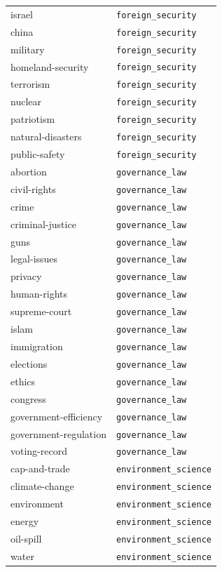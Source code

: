 \begin{longtable}{ll}
israel & \texttt{foreign\_security} \\
china & \texttt{foreign\_security} \\
military & \texttt{foreign\_security} \\
homeland-security & \texttt{foreign\_security} \\
terrorism & \texttt{foreign\_security} \\
nuclear & \texttt{foreign\_security} \\
patriotism & \texttt{foreign\_security} \\
natural-disasters & \texttt{foreign\_security} \\
public-safety & \texttt{foreign\_security} \\
\midrule
abortion & \texttt{governance\_law} \\
civil-rights & \texttt{governance\_law} \\
crime & \texttt{governance\_law} \\
criminal-justice & \texttt{governance\_law} \\
guns & \texttt{governance\_law} \\
legal-issues & \texttt{governance\_law} \\
privacy & \texttt{governance\_law} \\
human-rights & \texttt{governance\_law} \\
supreme-court & \texttt{governance\_law} \\
islam & \texttt{governance\_law} \\
immigration & \texttt{governance\_law} \\
elections & \texttt{governance\_law} \\
ethics & \texttt{governance\_law} \\
congress & \texttt{governance\_law} \\
government-efficiency & \texttt{governance\_law} \\
government-regulation & \texttt{governance\_law} \\
voting-record & \texttt{governance\_law} \\
\midrule
cap-and-trade & \texttt{environment\_science} \\
climate-change & \texttt{environment\_science} \\
environment & \texttt{environment\_science} \\
energy & \texttt{environment\_science} \\
oil-spill & \texttt{environment\_science} \\
water & \texttt{environment\_science} \\

\end{longtable}
